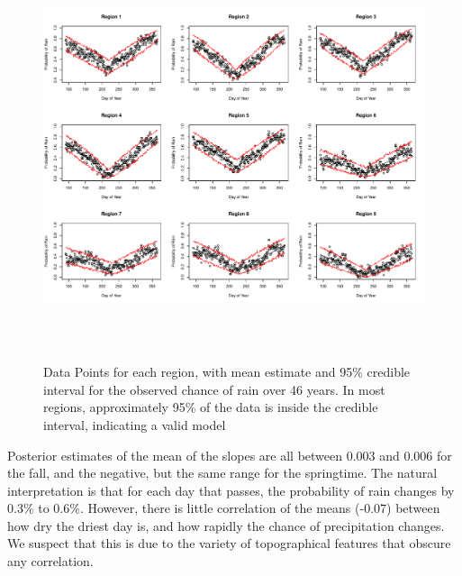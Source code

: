 \documentclass{article}
\begin{document}
\begin{figure}[h!]
\centering
\includegraphics[width = .8\textwidth, height = 12cm]{AllRegionPosterior}
\caption{Data Points for each region, with mean estimate and 95\% credible interval for the observed chance of rain over 46 years. In most regions, approximately 95\% of the data is inside the credible interval, indicating a valid model}
\label{fig:9by9}
\end{figure}
Posterior estimates of the mean of the slopes are all between 0.003 and 0.006 for the fall, and the negative, but the same range for the springtime. The natural interpretation is that for each day that passes, the probability of rain changes by 0.3\% to 0.6\%. However, there is little correlation of the means (-0.07) between how dry the driest day is, and how rapidly the chance of precipitation changes. We suspect that this is due to the variety of topographical features that obscure any correlation. 
\end{document}
